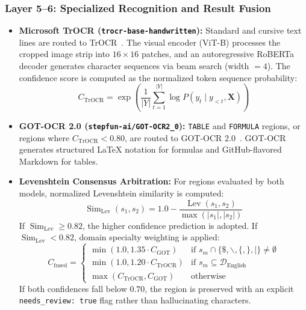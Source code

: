 \documentclass[journal]{IEEEtran}
\begin{document}
\subsubsection{Layer 5--6: Specialized Recognition and Result Fusion}
\begin{itemize}
    \item \textbf{Microsoft TrOCR (\texttt{trocr-base-handwritten}):} Standard and cursive text lines are routed to TrOCR~\cite{li2022trocr}. The visual encoder (ViT-B) processes the cropped image strip into $16 \times 16$ patches, and an autoregressive RoBERTa decoder generates character sequences via beam search (width $= 4$). The confidence score is computed as the normalized token sequence probability:
    \begin{equation}
        C_{\text{TrOCR}} = \exp\left(\frac{1}{|Y|} \sum_{t=1}^{|Y|} \log P(y_t \mid y_{<t}, \mathbf{X})\right)
    \end{equation}
    \item \textbf{GOT-OCR 2.0 (\texttt{stepfun-ai/GOT-OCR2\_0}):} \texttt{TABLE} and \texttt{FORMULA} regions, or regions where $C_{\text{TrOCR}} < 0.80$, are routed to GOT-OCR 2.0~\cite{cui2024got}. GOT-OCR generates structured \LaTeX{} notation for formulas and GitHub-flavored Markdown for tables.
    \item \textbf{Levenshtein Consensus Arbitration:} For regions evaluated by both models, normalized Levenshtein similarity is computed:
    \begin{equation}
        \operatorname{Sim}_{\text{Lev}}(s_1, s_2) = 1.0 - \frac{\operatorname{Lev}(s_1, s_2)}{\max(|s_1|, |s_2|)}
    \end{equation}
    If $\operatorname{Sim}_{\text{Lev}} \ge 0.82$, the higher confidence prediction is adopted. If $\operatorname{Sim}_{\text{Lev}} < 0.82$, domain specialty weighting is applied:
    \begin{equation}
        C_{\text{fused}} = \begin{cases} \min(1.0, 1.35 \cdot C_{\text{GOT}}) & \text{if } s_m \cap \{\$, \backslash, \{, \}, |\} \neq \emptyset \\ \min(1.0, 1.20 \cdot C_{\text{TrOCR}}) & \text{if } s_m \subseteq \mathcal{D}_{\text{English}} \\ \max(C_{\text{TrOCR}}, C_{\text{GOT}}) & \text{otherwise} \end{cases}
    \end{equation}
    If both confidences fall below $0.70$, the region is preserved with an explicit \texttt{needs\_review: true} flag rather than hallucinating characters.
\end{itemize}
\end{document}
